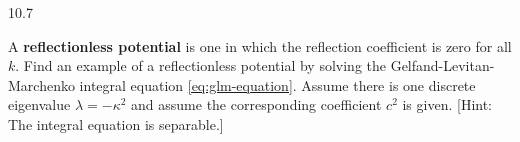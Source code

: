 \begin{exercises}{10.7}
\item A \textbf{reflectionless potential} is one in which the reflection coefficient is zero for all $k$.  Find an example of a reflectionless potential by solving the Gelfand-Levitan-Marchenko integral equation \eqref{eq:glm-equation}.  Assume there is one discrete eigenvalue $\lambda = -\kappa^2$ and assume the corresponding coefficient $c^2$ is given.  [Hint: The integral equation is separable.]
\end{exercises}

